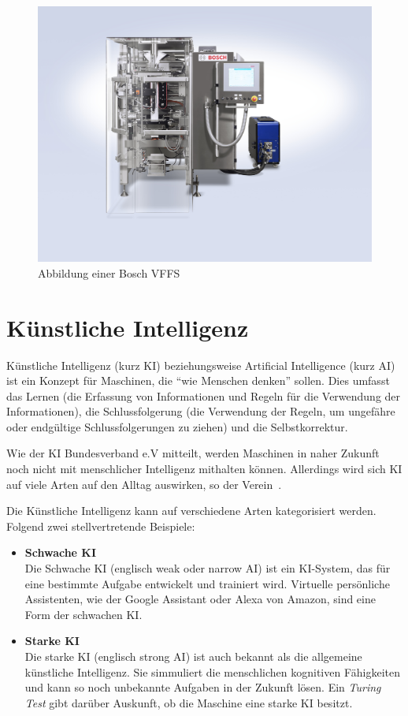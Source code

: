 \begin{figure}[h]
    \centering
    \includegraphics[scale=0.2]{images/kapitel_2/bosch_vffs.jpg}
    \caption{Abbildung einer Bosch VFFS}
    \label{fig:grundlagen_boschvffs}
\end{figure}

\section{Künstliche Intelligenz}
Künstliche Intelligenz (kurz KI) beziehungsweise Artificial Intelligence (kurz AI) ist ein Konzept für Maschinen, die
\enquote{wie Menschen denken} sollen. Dies umfasst das Lernen (die Erfassung von Informationen und Regeln für die
Verwendung der Informationen), die Schlussfolgerung (die Verwendung der Regeln, um ungefähre oder endgültige
Schlussfolgerungen zu ziehen) und die Selbstkorrektur.

Wie der KI Bundesverband e.V mitteilt, werden Maschinen in naher Zukunft noch nicht mit menschlicher Intelligenz
mithalten können. Allerdings wird sich KI auf viele Arten auf den Alltag auswirken, so der
Verein~\cite{article_grundlagen_ki}.

Die Künstliche Intelligenz kann auf verschiedene Arten kategorisiert werden. Folgend zwei stellvertretende Beispiele:

\begin{itemize}
    \item \textbf{Schwache KI} \\
    Die Schwache KI (englisch weak oder narrow AI) ist ein KI-System, das für eine bestimmte Aufgabe entwickelt und
    trainiert wird. Virtuelle persönliche Assistenten, wie der Google Assistant oder Alexa von Amazon, sind eine Form
    der schwachen KI.
    \item \textbf{Starke KI} \\
    Die starke KI (englisch strong AI) ist auch bekannt als die allgemeine künstliche Intelligenz. Sie simmuliert die
    menschlichen kognitiven Fähigkeiten und kann so noch unbekannte Aufgaben in der Zukunft lösen. Ein
    \textit{Turing Test} gibt darüber Auskunft, ob die Maschine eine starke KI besitzt.
\end{itemize}

